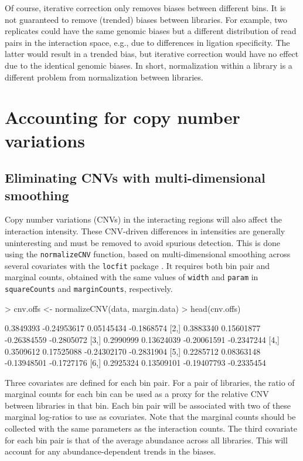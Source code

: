 \documentclass[12pt]{report}
\renewenvironment{Schunk}{\vspace{0pt}}{\vspace{0pt}}
\newcommand{\code}[1]{{\small\texttt{#1}}}
\begin{document}
Of course, iterative correction only removes biases between different bins.
It is not guaranteed to remove (trended) biases between libraries.
For example, two replicates could have the same genomic biases but a different distribution of read pairs in the interaction space, e.g., due to differences in ligation specificity.
The latter would result in a trended bias, but iterative correction would have no effect due to the identical genomic biases.
In short, normalization within a library is a different problem from normalization between libraries.

\section{Accounting for copy number variations}
\label{sec:copy}

\subsection{Eliminating CNVs with multi-dimensional smoothing}
Copy number variations (CNVs) in the interacting regions will also affect the interaction intensity. 
These CNV-driven differences in intensities are generally uninteresting and must be removed to avoid spurious detection.
This is done using the \code{normalizeCNV} function, based on multi-dimensional smoothing across several covariates with the \code{locfit} package \citep{loader1999local}.
It requires both bin pair and marginal counts, obtained with the same values of \code{width} and \code{param} in \code{squareCounts} and \code{marginCounts}, respectively.

\begin{Schunk}
\begin{Sinput}
> cnv.offs <- normalizeCNV(data, margin.data)
> head(cnv.offs)
\end{Sinput}
\begin{Soutput}
          [,1]        [,2]        [,3]       [,4]
[1,] 0.3849393 -0.24953617  0.05145434 -0.1868574
[2,] 0.3883340  0.15601877 -0.26384559 -0.2805072
[3,] 0.2990999  0.13624039 -0.20061591 -0.2347244
[4,] 0.3509612  0.17525088 -0.24302170 -0.2831904
[5,] 0.2285712  0.08363148 -0.13948501 -0.1727176
[6,] 0.2925324  0.13509101 -0.19407793 -0.2335454
\end{Soutput}
\end{Schunk}

Three covariates are defined for each bin pair.
For a pair of libraries, the ratio of marginal counts for each bin can be used as a proxy for the relative CNV between libraries in that bin.
Each bin pair will be associated with two of these marginal log-ratios to use as covariates.
Note that the marginal counts should be collected with the same parameters as the interaction counts.
The third covariate for each bin pair is that of the average abundance across all libraries.
This will account for any abundance-dependent trends in the biases.
\end{document}

